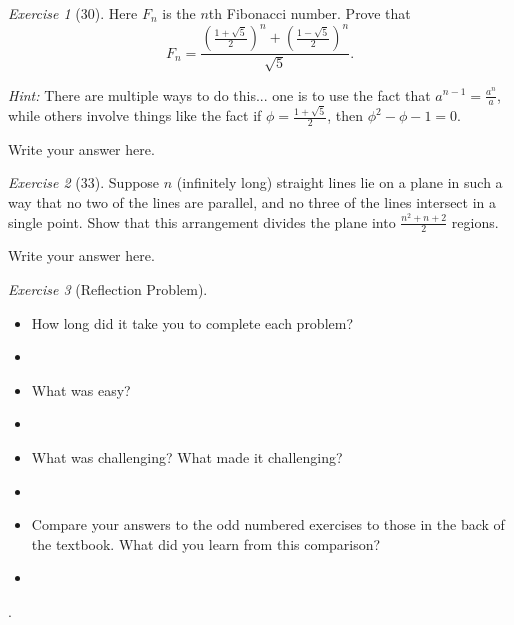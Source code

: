 \documentclass[12pt]{amsart}
\makeatletter
\theoremstyle{remark}
\newtheorem*{exercise}{Exercise}%
\renewenvironment{proof}[1][\proofname]{\par\doublespacing
  \pushQED{\qed}%
  \normalfont \topsep6\p@\@plus6\p@\relax
  \list{}{%
    \settowidth{\leftmargin}{\itshape\proofname:\hskip\labelsep}%
    \setlength{\labelwidth}{0pt}%
    \setlength{\itemindent}{-\leftmargin}%
  }%
  \item[\hskip\labelsep\itshape#1\@addpunct{:}]\ignorespaces
}{%
  \popQED\endlist\@endpefalse
  \singlespacing
}
\theoremstyle{mycomment}
\makeatother
\begin{document}
\begin{exercise}[30] Here $F_{n}$ is the $n$th Fibonacci number. Prove that $$F_{n}=\frac{\left(\frac{1+\sqrt{5}}{2}\right)^{n}+\left(\frac{1-\sqrt{5}}{2}\right)^{n}}{\sqrt{5}}.$$

\emph{Hint:} There are multiple ways to do this... one is to use the fact that $a^{n-1}=\frac{a^{n}}{a}$, while others involve things like the fact if $\phi=\frac{1+\sqrt{5}}{2}$, then $\phi^{2}-\phi-1=0$.
\begin{proof}
Write your answer here.
\end{proof}
\end{exercise}

\begin{exercise}[33] Suppose $n$ (infinitely long) straight lines lie on a plane in such a way that no two of the lines are parallel, and no three of the lines intersect in a single point. Show that this arrangement divides the plane into $\frac{n^{2}+n+2}{2}$ regions.
\begin{proof}
Write your answer here.
\end{proof}
\end{exercise}



\begin{exercise}[Reflection Problem] \ 
\begin{itemize}
\item How long did it take you to complete each problem? 
\begin{proof}[Answer]
\end{proof}
\item What was easy?
\begin{proof}[Answer]
\end{proof}
\item What was challenging? What made it challenging?
\begin{proof}[Answer]
\end{proof}
\item Compare your answers to the odd numbered exercises to those in the back of the textbook. What did you learn from this comparison?
\begin{proof}[Answer]
\end{proof}
\end{itemize}
\end{exercise}.















 
\end{document}
